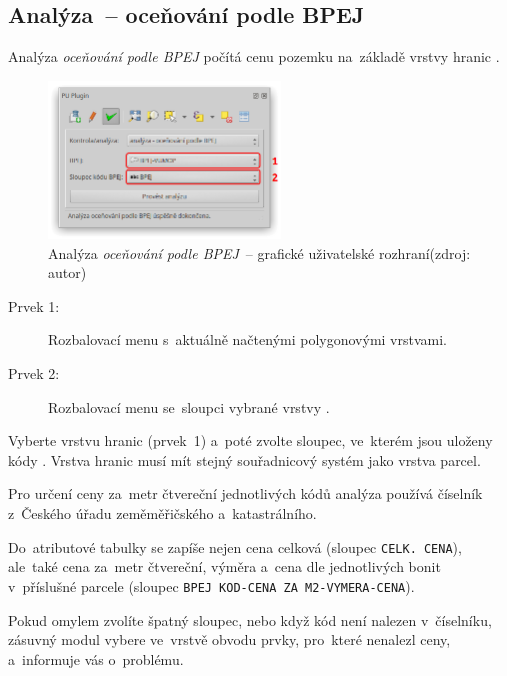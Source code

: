 \subsection{Analýza~– oceňování podle BPEJ}
\label{manual_analyza_bpej}

Analýza \textit{oceňování podle BPEJ} počítá cenu pozemku na~základě
vrstvy hranic .

	\begin{figure}[H] \centering
		\includegraphics[width=0.55\textwidth]{./pictures/analyza_bpej.png}
		\caption[Analýza \textit{oceňování podle BPEJ}~–
grafické uživatelské rozhraní]{Analýza \textit{oceňování podle BPEJ}~–
grafické uživatelské rozhraní\newline (zdroj: autor)}
		\label{fig:manual_analyza_bpej_gui}
 	\end{figure}

\begin{description}
	\item[Prvek 1:] Rozbalovací menu s~aktuálně načtenými
polygonovými vrstvami.
	\item[Prvek 2:] Rozbalovací menu se~sloupci vybrané vrstvy
.
\end{description}

Vyberte vrstvu hranic  (prvek~1) a~poté zvolte sloupec,
ve~kterém jsou uloženy kódy . Vrstva hranic  musí
mít stejný souřadnicový systém jako vrstva parcel.

Pro určení ceny za~metr čtvereční jednotlivých kódů  analýza
používá číselník  z~Českého úřadu zeměměřičského
a~katastrálního.

Do~atributové tabulky se zapíše nejen cena celková (sloupec
\texttt{CELK. CENA}), ale~také cena za~metr čtvereční, výměra a~cena
dle jednotlivých bonit v~příslušné parcele (sloupec \texttt{BPEJ
KOD-CENA ZA M2-VYMERA-CENA}).

Pokud omylem zvolíte špatný slou\-pec, nebo když kód  není
nalezen v~číselníku, zásuvný modul vybere ve~vrstvě obvodu prvky,
pro~které nenalezl ceny, a~informuje vás o~problému.
